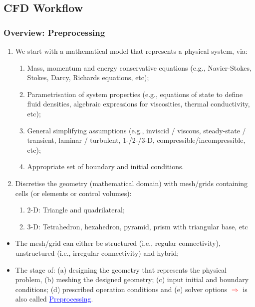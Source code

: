 \documentclass[10pt,compress,handout,ignorenonframetext]{beamer}
\begin{document}
\subsection{CFD Workflow}
 
\begin{frame}
 \frametitle{Overview: Preprocessing} 
\begin{enumerate}
  \item <1-> We start with a mathematical model that represents a physical system, via:
    \begin{enumerate}
      \item <2-> Mass, momentum and energy conservative equations (e.g., Navier-Stokes, Stokes, Darcy, Richards equations, etc);
      \item <3-> Parametrisation of system properties (e.g., equations of state to define fluid densities, algebraic expressions for viscosities, thermal conductivity, etc);
      \item <4-> General simplifying assumptions (e.g., inviscid / viscous, steady-state / transient, laminar / turbulent, 1-/2-/3-D, compressible/incompressible, etc); 
      \item <5-> Appropriate set of boundary and initial conditions.
    \end{enumerate}
  \item <6-> Discretise the geometry (mathematical domain) with mesh/grids containing cells (or elements or control volumes): 
    \begin{enumerate}
      \item <7-> 2-D: Triangle and quadrilateral;
      \item <8-> 3-D: Tetrahedron, hexahedron, pyramid, prism with triangular base, etc 
    \end{enumerate}
\end{enumerate} 
\begin{itemize}
   \item <9-> The mesh/grid can either be structured (i.e., regular connectivity), unstructured (i.e., irregular connectivity) and hybrid;
   \item <10-> The stage of: (a) designing the geometry that represents the physical problem, (b) meshing the designed geometry; (c) input initial and boundary conditions; (d) prescribed operation conditions and (e) solver options \textcolor{red}{$\Longrightarrow$} is also called \textcolor{blue}{\underline{Preprocessing}}.
\end{itemize}  

\end{frame} 
\end{document}
